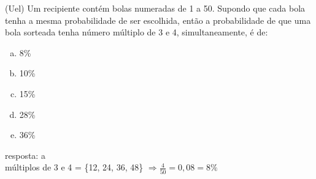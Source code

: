 \begin{ex}
 (Uel) Um recipiente contém bolas numeradas de 1 a 50. Supondo que cada bola tenha a mesma probabilidade de ser escolhida, então a probabilidade de que uma bola sorteada tenha número múltiplo de 3 e 4, simultaneamente, é de:
   \begin{enumerate}[(a)]
   \item 8\%
   \item 10\%
   \item 15\%
   \item 28\%
   \item 36\%
   \end{enumerate}
     \begin{sol}
      resposta: a \\
      múltiplos de 3 e 4 = \{12, 24, 36, 48\} $\Longrightarrow \frac{4}{50}=0,08=8\%$
     \end{sol}
\end{ex}